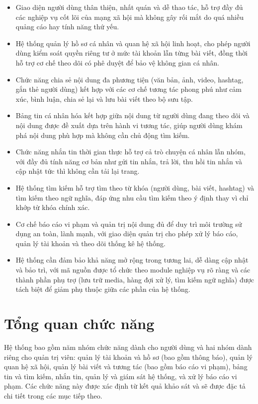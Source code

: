 \documentclass[../DoAn.tex]{subfiles}
\begin{document}
\begin{itemize}
    \item Giao diện người dùng thân thiện, nhất quán và dễ thao tác, hỗ trợ đầy đủ các nghiệp vụ cốt lõi của mạng xã hội mà không gây rối mắt do quá nhiều quảng cáo hay tính năng thứ yếu.

    \item Hệ thống quản lý hồ sơ cá nhân và quan hệ xã hội linh hoạt, cho phép người dùng kiểm soát quyền riêng tư ở mức tài khoản lẫn từng bài viết, đồng thời hỗ trợ cơ chế theo dõi có phê duyệt để bảo vệ không gian cá nhân.

    \item Chức năng chia sẻ nội dung đa phương tiện (văn bản, ảnh, video, hashtag, gắn thẻ người dùng) kết hợp với các cơ chế tương tác phong phú như cảm xúc, bình luận, chia sẻ lại và lưu bài viết theo bộ sưu tập.

    \item Bảng tin cá nhân hóa kết hợp giữa nội dung từ người dùng đang theo dõi và nội dung được đề xuất dựa trên hành vi tương tác, giúp người dùng khám phá nội dung phù hợp mà không cần chủ động tìm kiếm.

    \item Chức năng nhắn tin thời gian thực hỗ trợ cả trò chuyện cá nhân lẫn nhóm, với đầy đủ tính năng cơ bản như gửi tin nhắn, trả lời, thu hồi tin nhắn và cập nhật tức thì không cần tải lại trang.

    \item Hệ thống tìm kiếm hỗ trợ tìm theo từ khóa (người dùng, bài viết, hashtag) và tìm kiếm theo ngữ nghĩa, đáp ứng nhu cầu tìm kiếm theo ý định thay vì chỉ khớp từ khóa chính xác.

    \item Cơ chế báo cáo vi phạm và quản trị nội dung đủ để duy trì môi trường sử dụng an toàn, lành mạnh, với giao diện quản trị cho phép xử lý báo cáo, quản lý tài khoản và theo dõi thống kê hệ thống.

    \item Hệ thống cần đảm bảo khả năng mở rộng trong tương lai, dễ dàng cập nhật và bảo trì, với mã nguồn được tổ chức theo module nghiệp vụ rõ ràng và các thành phần phụ trợ (lưu trữ media, hàng đợi xử lý, tìm kiếm ngữ nghĩa) được tách biệt để giảm phụ thuộc giữa các phần của hệ thống.
\end{itemize}

\section{Tổng quan chức năng}
\label{section:2.2}
Hệ thống bao gồm năm nhóm chức năng dành cho người dùng và hai nhóm dành riêng cho quản trị viên: quản lý tài khoản và hồ sơ (bao gồm thông báo), quản lý quan hệ xã hội, quản lý bài viết và tương tác (bao gồm báo cáo vi phạm), bảng tin và tìm kiếm, nhắn tin, quản lý và giám sát hệ thống, và xử lý báo cáo vi phạm. Các chức năng này được xác định từ kết quả khảo sát và sẽ được đặc tả chi tiết trong các mục tiếp theo.
\end{document}
